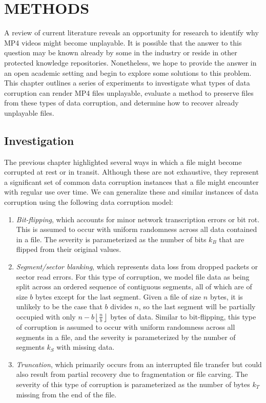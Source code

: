 \chapter{\uppercase{Methods}}
\label{cha:methods}

A review of current literature reveals an opportunity for research to identify why MP4 videos might become unplayable. It is possible that the answer to this question may be known already by some in the industry or reside in other protected knowledge repositories. Nonetheless, we hope to provide the answer in an open academic setting and begin to explore some solutions to this problem. This chapter outlines a series of experiments to investigate what types of data corruption can render MP4 files unplayable, evaluate a method to preserve files from these types of data corruption, and determine how to recover already unplayable files.

\section{Investigation}
\label{sec:methods-investigation}
 
The previous chapter highlighted several ways in which a file might become corrupted at rest or in transit. Although these are not exhaustive, they represent a significant set of common data corruption instances that a file might encounter with regular use over time. We can generalize these and similar instances of data corruption using the following data corruption model:
\begin{enumerate}
    \item \emph{Bit-flipping}, which accounts for minor network transcription errors or bit rot. This is assumed to occur with uniform randomness across all data contained in a file. The severity is parameterized as the number of bits \( k_B \) that are flipped from their original values.
    \item \emph{Segment/sector blanking}, which represents data loss from dropped packets or sector read errors. For this type of corruption, we model file data as being split across an ordered sequence of contiguous segments, all of which are of size \( b \) bytes except for the last segment. Given a file of size \( n \) bytes, it is unlikely to be the case that \( b \) divides \( n \), so the last segment will be partially occupied with only \( n - b \left\lfloor \frac{n}{b} \right\rfloor \) bytes of data. Similar to bit-flipping, this type of corruption is assumed to occur with uniform randomness across all segments in a file, and the severity is parameterized by the number of segments \( k_S \) with missing data.
    \item \emph{Truncation}, which primarily occurs from an interrupted file transfer but could also result from partial recovery due to fragmentation or file carving. The severity of this type of corruption is parameterized as the number of bytes \( k_T \) missing from the end of the file.
\end{enumerate}

